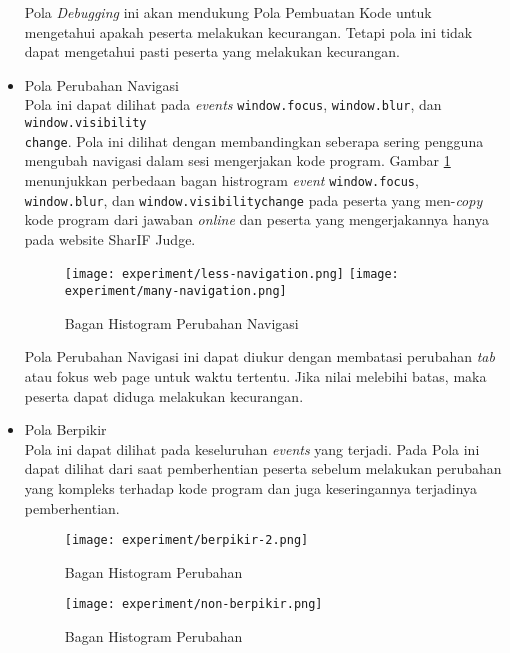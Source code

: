 \begin{itemize}
    Pola \textit{Debugging} ini akan mendukung Pola Pembuatan Kode untuk mengetahui apakah peserta melakukan kecurangan. Tetapi pola ini tidak dapat mengetahui pasti peserta yang melakukan kecurangan.

    \item Pola Perubahan Navigasi \\
    Pola ini dapat dilihat pada \textit{events} \verb|window.focus|, \verb|window.blur|, dan \verb|window.visibility|\\\verb|change|. Pola ini dilihat dengan membandingkan seberapa sering pengguna mengubah navigasi dalam sesi mengerjakan kode program. 
    Gambar \ref{fig:5:2:3:navigation} menunjukkan perbedaan bagan histrogram \textit{event} \verb|window.focus|, \verb|window.blur|, dan \verb|window.visibilitychange| pada peserta yang men-\textit{copy} kode program dari jawaban \textit{online} dan peserta yang mengerjakannya hanya pada website SharIF Judge.  

    \begin{figure}[H]
        \centering
        \texttt{[image: experiment/less-navigation.png]}
        \texttt{[image: experiment/many-navigation.png]}
        \caption{Bagan Histogram Perubahan Navigasi}
        \label{fig:5:2:3:navigation}
    \end{figure}

    Pola Perubahan Navigasi ini dapat diukur dengan membatasi perubahan \textit{tab} atau fokus web page untuk waktu tertentu. Jika nilai melebihi batas, maka peserta dapat diduga melakukan kecurangan.

    \item Pola Berpikir \\
    Pola ini dapat dilihat pada keseluruhan \textit{events} yang terjadi. Pada Pola ini dapat dilihat dari saat pemberhentian peserta sebelum melakukan perubahan yang kompleks terhadap kode program dan juga keseringannya terjadinya pemberhentian.
    
    \begin{figure}[H]
        \centering
        \texttt{[image: experiment/berpikir-2.png]}
        \caption{Bagan Histogram Perubahan}
        \label{fig:5:2:3:berpikir}
    \end{figure}

    \begin{figure}[H]
        \centering
        \texttt{[image: experiment/non-berpikir.png]}
        \caption{Bagan Histogram Perubahan}
        \label{fig:5:2:3:tidakberpikir}
    \end{figure}


\end{itemize}

